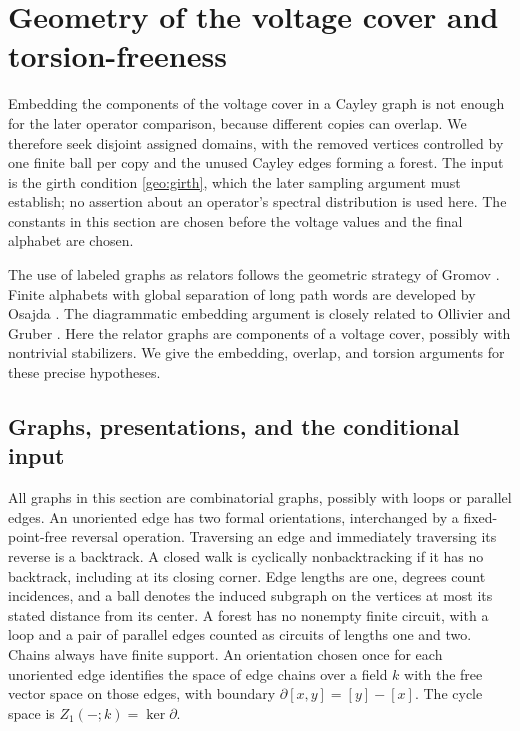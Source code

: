 \section{Geometry of the voltage cover and torsion-freeness}
\label{geo:section}

Embedding the components of the voltage cover in a Cayley graph is not
enough for the later operator comparison, because different copies can
overlap.  We therefore seek disjoint assigned domains, with the removed
vertices controlled by one finite ball per copy and the unused Cayley
edges forming a forest.  The input is the girth condition
\eqref{geo:girth}, which the later sampling argument must establish;
no assertion about an operator's spectral distribution is used here.
The constants in this section are chosen before the voltage values and
the final alphabet are chosen.

The use of labeled graphs as relators follows the geometric strategy of
Gromov \cite[Sections~2 and~4.8]{Gromov2003}. Finite alphabets with global
separation of long path words are developed by Osajda
\cite[Section~2]{Osajda2020}.  The diagrammatic embedding argument is
closely related to Ollivier \cite[Section~2]{Ollivier2006} and Gruber
\cite[Lemma~4.1]{Gruber2015}.
Here the relator graphs are components of a voltage cover, possibly with
nontrivial stabilizers. We give the embedding, overlap, and torsion
arguments for these precise hypotheses.

\subsection{Graphs, presentations, and the conditional input}
\label{geo:conventions}

All graphs in this section are combinatorial graphs, possibly with loops or
parallel edges.  An unoriented edge has two formal orientations, interchanged
by a fixed-point-free reversal operation.  Traversing an edge and immediately
traversing its reverse is a backtrack.  A closed walk is cyclically
nonbacktracking if it has no backtrack, including at its closing corner.
Edge lengths are one, degrees count incidences, and a ball denotes the induced
subgraph on the vertices at most its stated distance from its center.  A
forest has no nonempty finite circuit, with a loop and a pair of parallel
edges counted as circuits of lengths one and two.  Chains always have finite
support.  An orientation chosen once for each unoriented edge identifies the
space of edge chains over a field $k$ with the free vector space on those
edges, with boundary $\partial[x,y]=[y]-[x]$.  The cycle space is
$Z_1(-;k)=\ker\partial$.

